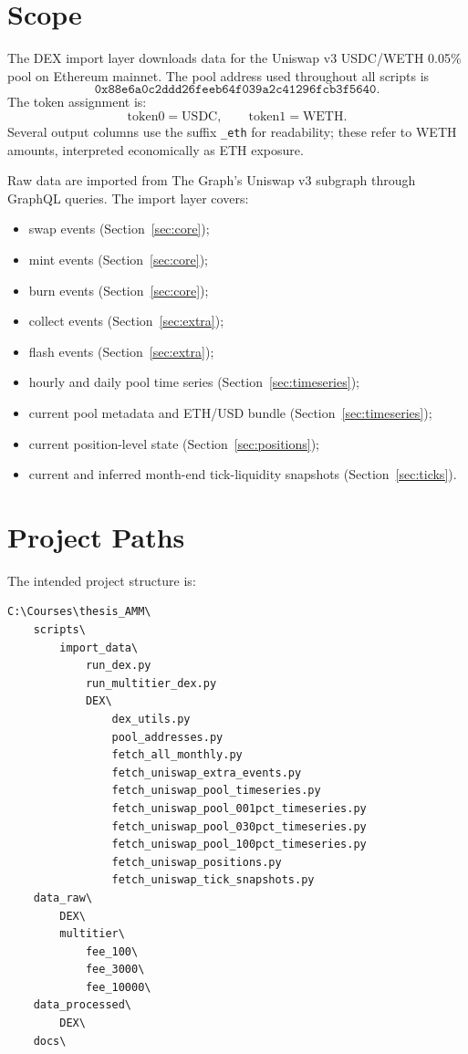 \documentclass[11pt,a4paper]{article}
\begin{document}
\section{Scope}
\label{sec:scope}

The DEX import layer downloads data for the Uniswap v3 USDC/WETH 0.05\%
pool on Ethereum mainnet. The pool address used throughout all scripts is
\[
  \texttt{0x88e6a0c2ddd26feeb64f039a2c41296fcb3f5640}.
\]
The token assignment is:
\[
  \text{token0} = \text{USDC}, \qquad \text{token1} = \text{WETH}.
\]
Several output columns use the suffix \texttt{\_eth} for readability; these
refer to WETH amounts, interpreted economically as ETH exposure.

Raw data are imported from The Graph's Uniswap v3 subgraph through GraphQL
queries. The import layer covers:

\begin{itemize}
  \item swap events (Section~\ref{sec:core});
  \item mint events (Section~\ref{sec:core});
  \item burn events (Section~\ref{sec:core});
  \item collect events (Section~\ref{sec:extra});
  \item flash events (Section~\ref{sec:extra});
  \item hourly and daily pool time series (Section~\ref{sec:timeseries});
  \item current pool metadata and ETH/USD bundle (Section~\ref{sec:timeseries});
  \item current position-level state (Section~\ref{sec:positions});
  \item current and inferred month-end tick-liquidity snapshots
        (Section~\ref{sec:ticks}).
\end{itemize}

\section{Project Paths}
\label{sec:paths}

The intended project structure is:

\begin{lstlisting}
C:\Courses\thesis_AMM\
    scripts\
        import_data\
            run_dex.py
            run_multitier_dex.py
            DEX\
                dex_utils.py
                pool_addresses.py
                fetch_all_monthly.py
                fetch_uniswap_extra_events.py
                fetch_uniswap_pool_timeseries.py
                fetch_uniswap_pool_001pct_timeseries.py
                fetch_uniswap_pool_030pct_timeseries.py
                fetch_uniswap_pool_100pct_timeseries.py
                fetch_uniswap_positions.py
                fetch_uniswap_tick_snapshots.py
    data_raw\
        DEX\
        multitier\
            fee_100\
            fee_3000\
            fee_10000\
    data_processed\
        DEX\
    docs\
\end{lstlisting}
\end{document}
